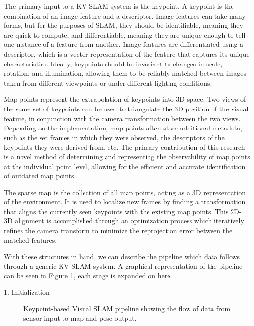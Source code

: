 The primary input to a KV-SLAM system is the keypoint. A keypoint is the combination of an image feature and a descriptor. Image features can take many forms, but for the purposes of SLAM, they should be identifiable, meaning they are quick to compute, and differentiable, meaning they are unique enough to tell one instance of a feature from another. Image features are differentiated using a descriptor, which is a vector representation of the feature that captures its unique characteristics. Ideally, keypoints should be invariant to changes in scale, rotation, and illumination, allowing them to be reliably matched between images taken from different viewpoints or under different lighting conditions.

Map points represent the extrapolation of keypoints into 3D space. Two views of the same set of keypoints can be used to triangulate the 3D position of the visual feature, in conjunction with the camera transformation between the two views. Depending on the implementation, map points often store additional metadata, such as the set frames in which they were observed, the descriptors of the keypoints they were derived from, etc. The primary contribution of this research is a novel method of determining and representing the observability of map points at the individual point level, allowing for the efficient and accurate identification of outdated map points.

The sparse map is the collection of all map points, acting as a 3D representation of the environment. It is used to localize new frames by finding a transformation that aligns the currently seen keypoints with the existing map points. This 2D-3D alignment is accomplished through an optimization process which iteratively refines the camera transform to minimize the reprojection error between the matched features.

With these structures in hand, we can describe the pipeline which data follows through a generic KV-SLAM system. A graphical representation of the pipeline can be seen in Figure \ref{fig:kv_slam_pipeline}, each stage is expanded on here.

1. Initialization

\begin{figure}[!ht]
    \centering
    \caption{Keypoint-based Visual SLAM pipeline showing the flow of data from sensor input to map and pose output.}
    \label{fig:kv_slam_pipeline}
\end{figure}

